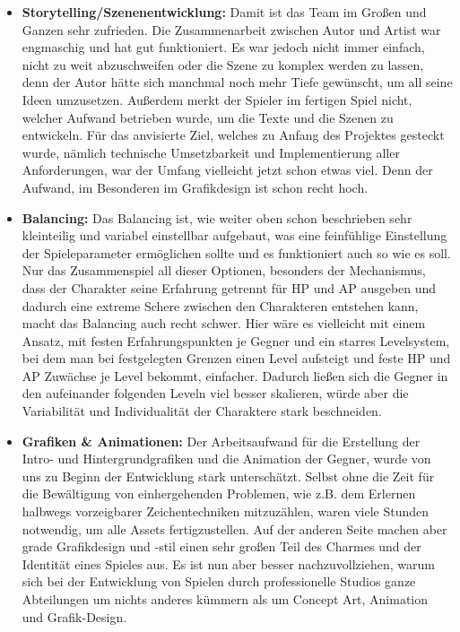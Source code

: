 \begin{itemize}
    \item \textbf{Storytelling/Szenenentwicklung:} Damit ist das Team im Großen und Ganzen sehr zufrieden. Die Zusammenarbeit zwischen Autor und Artist war engmaschig und hat gut funktioniert. Es war jedoch nicht immer einfach, nicht zu weit abzuschweifen oder die Szene zu komplex werden zu lassen, denn der Autor hätte sich manchmal noch mehr Tiefe gewünscht, um all seine Ideen umzusetzen. Außerdem merkt der Spieler im fertigen Spiel nicht, welcher Aufwand betrieben wurde, um die Texte und die Szenen zu entwickeln. Für das anvisierte Ziel, welches zu Anfang des Projektes gesteckt wurde, nämlich technische Umsetzbarkeit und Implementierung aller Anforderungen, war der Umfang vielleicht jetzt schon etwas viel. Denn der Aufwand, im Besonderen im Grafikdesign ist schon recht hoch.

    \item \textbf{Balancing:} Das Balancing ist, wie weiter oben schon beschrieben sehr kleinteilig und variabel einstellbar aufgebaut, was eine feinfühlige Einstellung der Spieleparameter ermöglichen sollte und es funktioniert auch so wie es soll. Nur das Zusammenspiel all dieser Optionen, besonders der Mechanismus, dass der Charakter seine Erfahrung getrennt für HP und AP ausgeben und dadurch eine extreme Schere zwischen den Charakteren entstehen kann, macht das Balancing auch recht schwer. Hier wäre es vielleicht mit einem Ansatz, mit festen Erfahrungspunkten je Gegner und ein starres Levelsystem, bei dem man bei festgelegten Grenzen einen Level aufsteigt und feste HP und AP Zuwächse je Level bekommt, einfacher. Dadurch ließen sich die Gegner in den aufeinander folgenden Leveln viel besser skalieren, würde aber die Variabilität und Individualität der Charaktere stark beschneiden.
    
    \item \textbf{Grafiken \& Animationen:} Der Arbeitsaufwand für die Erstellung der Intro- und Hintergrundgrafiken und die Animation der Gegner, wurde von uns zu Beginn der Entwicklung stark unterschätzt. Selbst ohne die Zeit für die Bewältigung von einhergehenden Problemen, wie z.B. dem Erlernen halbwegs vorzeigbarer Zeichentechniken mitzuzählen, waren viele Stunden notwendig, um alle Assets fertigzustellen. Auf der anderen Seite machen aber grade Grafikdesign und -stil einen sehr großen Teil des Charmes und der Identität eines Spieles aus. Es ist nun aber besser nachzuvollziehen, warum sich bei der Entwicklung von Spielen durch professionelle Studios ganze Abteilungen um nichts anderes kümmern als um Concept Art, Animation und Grafik-Design.
    

\end{itemize}
